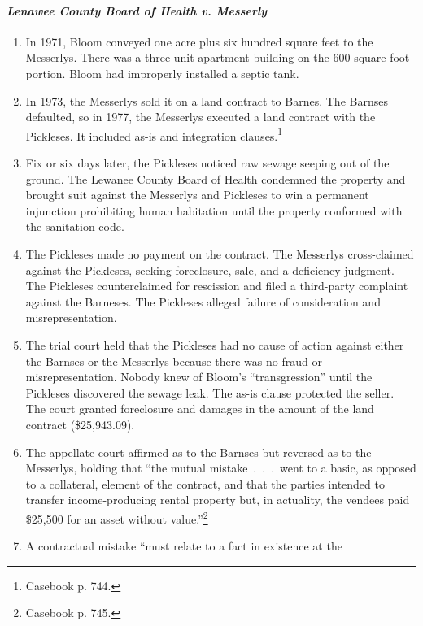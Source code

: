 \paragraph{\emph{Lenawee County Board of Health v. Messerly}}

\begin{enumerate}
    \item In 1971, Bloom conveyed one acre plus six hundred square feet to the 
    Messerlys. There was a three-unit apartment building on the 600 square 
    foot portion. Bloom had improperly installed a septic tank.
    \item In 1973, the Messerlys sold it on a land contract to Barnes. The 
    Barnses defaulted, so in 1977, the Messerlys executed a land contract with 
    the Pickleses. It included as-is and integration 
    clauses.\footnote{Casebook p. 744.}
    \item Fix or six days later, the Pickleses noticed raw sewage seeping out 
    of the ground. The Lewanee County Board of Health condemned the property 
    and brought suit against the Messerlys and Pickleses to win a permanent 
    injunction prohibiting human habitation until the property conformed with 
    the sanitation code.
    \item The Pickleses made no payment on the contract. The Messerlys 
    cross-claimed against the Pickleses, seeking foreclosure, sale, and a 
    deficiency judgment. The Pickleses counterclaimed for rescission and filed 
    a third-party complaint against the Barneses. The Pickleses alleged 
    failure of consideration and misrepresentation.
    \item The trial court held that the Pickleses had no cause of action 
    against either the Barnses or the Messerlys because there was no fraud or 
    misrepresentation. Nobody knew of Bloom's ``transgression'' until the 
    Pickleses discovered the sewage leak. The as-is clause protected the 
    seller. The court granted foreclosure and damages in the amount of the 
    land contract (\$25,943.09).
    \item The appellate court affirmed as to the Barnses but reversed as to 
    the Messerlys, holding that ``the mutual mistake~.~.~.~went to a basic, as 
    opposed to a collateral, element of the contract, and that the parties 
    intended to transfer income-producing rental property but, in actuality, 
    the vendees paid \$25,500 for an asset without value.''\footnote{Casebook 
    p. 745.}
    \item A contractual mistake ``must relate to a fact in existence at the 

\end{enumerate}
